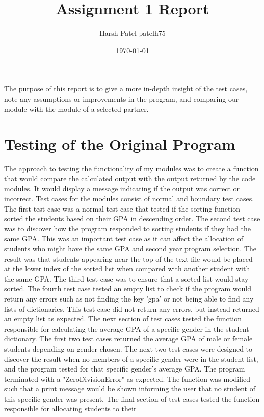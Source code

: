 \documentclass[12pt]{article}
\title{Assignment 1 Report}
\author{Harsh Patel patelh75}
\date{\today}
\begin{document}
\maketitle

The purpose of this report is to give a more in-depth insight of the test cases, note any assumptions or improvements in the program, 
and comparing our module with the module of a selected partner.

\section{Testing of the Original Program}

The approach to testing the functionality of my modules was to create a function that would compare 
the calculated output with the output returned by the code modules. It would display
a message indicating if the output was correct or incorrect. Test cases for the modules consist
of normal and boundary test cases. The first test case was a normal test case that tested 
if the sorting function sorted the students based on their GPA in descending 
order. The second test case was to discover how the program responded to sorting students if 
they had the same GPA. This was an important test case as it can affect the allocation of students 
who might have the same GPA and second year program selection. The result was that students appearing 
near the top of the text file would be placed at the lower index of the sorted list when compared 
with another student with the same GPA. The third test case was to ensure that a sorted list would stay 
sorted. The fourth test case tested an empty list to check if the program would return any errors such as 
not finding the key 'gpa' or not being able to find any lists of dictionaries. This test case did not return 
any errors, but instead returned an empty list as expected. The next section of test cases tested the function responsible 
for calculating the average GPA of a specific gender in the student dictionary. The first two test cases
returned the average GPA of male or female students depending on gender chosen. The next two test cases were designed 
to discover the result when no members of a specific gender were in the student list, and the program 
tested for that specific gender's average GPA. The program terminated with a "ZeroDivisionError" as expected. 
The function was modified such that a print message would be shown informing the user that no student of this specific 
gender was present. The final section of test cases tested the function responsible for allocating students to their 
\end{document}
